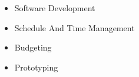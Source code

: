 
  \begin{itemize}
    \setlength\itemsep{-0.3em}
    \item Software Development
    \item Schedule And Time Management
    \item Budgeting
    \item Prototyping
  \end{itemize}
